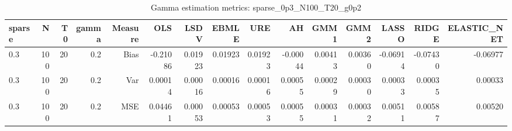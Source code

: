 \begin{table}[!htbp]\centering
\caption{Gamma estimation metrics: sparse_0p3_N100_T20_g0p2}
\label{tab:table1_sparse_0p3_N100_T20_g0p2}
\begin{tabular}{lrrrrrrrrrrrrrr}
\hline
sparse & N & T0 & gamma & Measure & OLS & LSDV & EBMLE & URE & AH & GMM1 & GMM2 & LASSO & RIDGE & ELASTIC_NET \\
\hline
0.3 & 100 & 20 & 0.2 & Bias & -0.21086 & 0.01923 & 0.01923 & 0.01923 & -0.00044 & 0.00413 & 0.00360 & -0.06914 & -0.07430 & -0.06977 \\
0.3 & 100 & 20 & 0.2 & Var & 0.00014 & 0.00016 & 0.00016 & 0.00016 & 0.00055 & 0.00029 & 0.00030 & 0.00033 & 0.00035 & 0.00033 \\
0.3 & 100 & 20 & 0.2 & MSE & 0.04461 & 0.00053 & 0.00053 & 0.00053 & 0.00055 & 0.00031 & 0.00032 & 0.00511 & 0.00587 & 0.00520 \\
\hline
\end{tabular}
\end{table}

